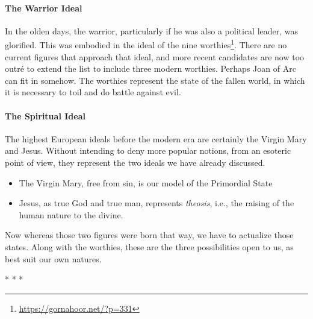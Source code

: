 \paragraph{The Warrior Ideal}


In the olden days, the warrior, particularly if he was also a political leader, was glorified. This was embodied in the ideal of the nine worthies\footnote{\url{https://gornahoor.net/?p=331}}. There are no current figures that approach that ideal, and more recent candidates are now too outré to extend the list to include three modern worthies. Perhaps Joan of Arc can fit in somehow. The worthies represent the state of the fallen world, in which it is necessary to toil and do battle against evil.

\paragraph{The Spiritual Ideal}


The highest European ideals before the modern era are certainly the Virgin Mary and Jesus. Without intending to deny more popular notions, from an esoteric point of view, they represent the two ideals we have already discussed.

\begin{itemize}


\item The Virgin Mary, free from sin, is our model of the Primordial State

\item Jesus, as true God and true man, represents \emph{theosis}, i.e., the raising of the human nature to the divine.
\end{itemize}


Now whereas those two figures were born that way, we have to actualize those states. Along with the worthies, these are the three possibilities open to us, as best suit our own natures.



\begin{center}* * *\end{center}

